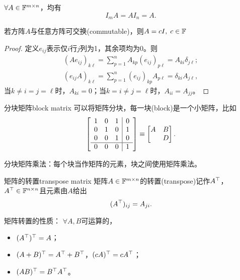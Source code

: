\begin{corollary}
	$\forall A\in\mathbb F^{m\times n}$，均有
	\[
		I_mA=AI_n=A.
	\]
\end{corollary}

\begin{theorem}{}{}
	若方阵$A$与任意方阵可交换(commutable)，则$A=cI,\;c\in\mathbb F$
\end{theorem}
\begin{proof}
	定义$e_{ij}$表示仅$i$行$j$列为1，其余项均为0。则
	\begin{align*}
		(Ae_{ij})_{k\ell}=\sum_{p=1}^nA_{kp}(e_{ij})_{p\ell}=A_{ki}\delta_{j\ell};\\
		(e_{ij}A)_{k\ell}=\sum_{p=1}^n(e_{ij})_{kp}A_{p\ell}=\delta_{ki}A_{j\ell},
	\end{align*}
	当$k\neq i=j=\ell$时，$A_{ki}=0$；当$k=i\neq j=\ell$时，$A_{ii}=A_{jj}$。
\end{proof}
\begin{definition}{分块矩阵}{block matrix}
	可以将矩阵分块，每一块(block)是一个小矩阵，比如
	\begin{align*}
		\left[\begin{array}{ccc|c}
			1&0&1&0\\
			0&1&0&1\\
			0&0&1&0\\
			\hline
			0&0&0&1	
		\end{array}\right]\equiv\begin{bmatrix}
			A&B\\ &D
		\end{bmatrix}.
	\end{align*}
\end{definition}
\begin{remark}
	分块矩阵乘法：每个块当作矩阵的元素，块之间使用矩阵乘法。
\end{remark}

\begin{definition}{矩阵的转置}{transpose matrix}
	矩阵$A\in\mathbb F^{m\times n}$的转置(transpose)记作$A^\top$，$A^\top\in\mathbb F^{n\times n}$且元素由$A$给出 
	\[
		(A^\top)_{ij}=A_{ji}.
	\]
\end{definition}
\begin{corollary}
	矩阵转置的性质：%
	$\forall A,B$可运算的，
	\begin{itemize}
		\item $(A^\top)^\top=A$；
		\item $(A+B)^\top=A^\top+B^\top$，$(cA)^\top=cA^\top$；
		\item $(AB)^\top=B^\top A^\top$。
	\end{itemize}
\end{corollary}

